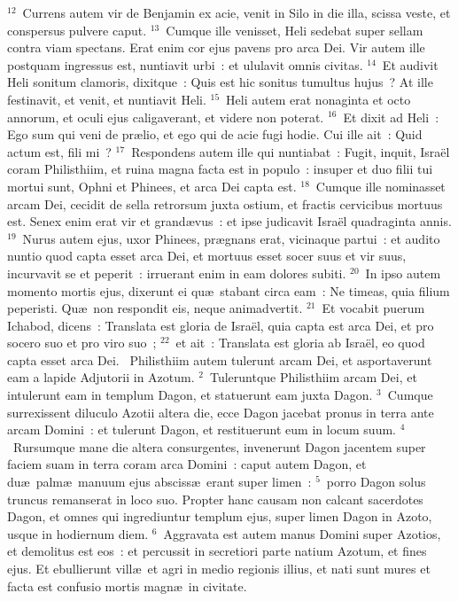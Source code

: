 ${}^{12}$~Currens autem vir de Benjamin ex acie, venit in Silo in die illa, scissa veste, et conspersus pulvere caput.
${}^{13}$~Cumque ille venisset, Heli sedebat super sellam contra viam spectans. Erat enim cor ejus pavens pro arca Dei. Vir autem ille postquam ingressus est, nuntiavit urbi~: et ululavit omnis civitas.
${}^{14}$~Et audivit Heli sonitum clamoris, dixitque~: Quis est hic sonitus tumultus hujus~? At ille festinavit, et venit, et nuntiavit Heli.
${}^{15}$~Heli autem erat nonaginta et octo annorum, et oculi ejus caligaverant, et videre non poterat.
${}^{16}$~Et dixit ad Heli~: Ego sum qui veni de pr\ae lio, et ego qui de acie fugi hodie. Cui ille ait~: Quid actum est, fili mi~?
${}^{17}$~Respondens autem ille qui nuntiabat~: Fugit, inquit, Isra\"el coram Philisthiim, et ruina magna facta est in populo~: insuper et duo filii tui mortui sunt, Ophni et Phinees, et arca Dei capta est.
${}^{18}$~Cumque ille nominasset arcam Dei, cecidit de sella retrorsum juxta ostium, et fractis cervicibus mortuus est. Senex enim erat vir et grand\ae vus~: et ipse judicavit Isra\"el quadraginta annis.
${}^{19}$~Nurus autem ejus, uxor Phinees, pr\ae gnans erat, vicinaque partui~: et audito nuntio quod capta esset arca Dei, et mortuus esset socer suus et vir suus, incurvavit se et peperit~: irruerant enim in eam dolores subiti.
${}^{20}$~In ipso autem momento mortis ejus, dixerunt ei qu\ae\ stabant circa eam~: Ne timeas, quia filium peperisti. Qu\ae\ non respondit eis, neque animadvertit.
${}^{21}$~Et vocabit puerum Ichabod, dicens~: Translata est gloria de Isra\"el, quia capta est arca Dei, et pro socero suo et pro viro suo~;
${}^{22}$~et ait~: Translata est gloria ab Isra\"el, eo quod capta esset arca Dei.
~Philisthiim autem tulerunt arcam Dei, et asportaverunt eam a lapide Adjutorii in Azotum.
${}^{2}$~Tuleruntque Philisthiim arcam Dei, et intulerunt eam in templum Dagon, et statuerunt eam juxta Dagon.
${}^{3}$~Cumque surrexissent diluculo Azotii altera die, ecce Dagon jacebat pronus in terra ante arcam Domini~: et tulerunt Dagon, et restituerunt eum in locum suum.
${}^{4}$~Rursumque mane die altera consurgentes, invenerunt Dagon jacentem super faciem suam in terra coram arca Domini~: caput autem Dagon, et du\ae\ palm\ae\ manuum ejus absciss\ae\ erant super limen~:
${}^{5}$~porro Dagon solus truncus remanserat in loco suo. Propter hanc causam non calcant sacerdotes Dagon, et omnes qui ingrediuntur templum ejus, super limen Dagon in Azoto, usque in hodiernum diem.
${}^{6}$~Aggravata est autem manus Domini super Azotios, et demolitus est eos~: et percussit in secretiori parte natium Azotum, et fines ejus. Et ebullierunt vill\ae\ et agri in medio regionis illius, et nati sunt mures et facta est confusio mortis magn\ae\ in civitate.
